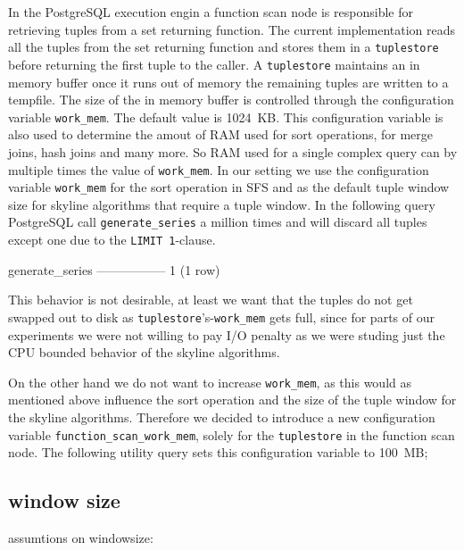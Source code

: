 In the PostgreSQL execution engin a function scan node is responsible
for retrieving tuples from a set returning function. The current
implementation reads all the tuples from the set returning function
and stores them in a \texttt{tuplestore} before returning the first
tuple to the caller. A \texttt{tuplestore} maintains an in memory
buffer once it runs out of memory the remaining tuples are written to
a tempfile. The size of the in memory buffer is controlled through the
configuration variable \texttt{work\_mem}. The default value is
1024~KB. This configuration variable is also used to determine the amout
of RAM used for sort operations, for merge joins, hash joins and many more.
So RAM used for a single complex query can by multiple times the value of 
\texttt{work\_mem}.
In our setting we use the configuration variable \texttt{work\_mem}
for the sort operation in SFS and as the default tuple window size for
skyline algorithms that require a tuple window. In the following query
PostgreSQL call \texttt{generate\_series} a million times and will
discard all tuples except one due to the
\texttt{LIMIT 1}-clause.

\begin{sqlscript}
 generate_series
-----------------
               1
(1 row)
\end{sqlscript}

This behavior is not desirable, at least we want that the tuples do
not get swapped out to disk as
\texttt{tuplestore}'s-\texttt{work\_mem} gets full, since for parts
of our experiments we were not willing to pay I/O penalty as we were
studing just the CPU bounded behavior of the skyline algorithms.

On the other hand we do not want to increase \texttt{work\_mem}, as
this would as mentioned above influence the sort operation and the size
of the tuple window for the skyline algorithms. Therefore we decided
to introduce a new configuration variable
\texttt{function\_scan\_work\_mem}, solely for the \texttt{tuplestore}
in the function scan node. The following utility query sets this
configuration variable to 100~MB;

\begin{sqlscript}
\end{sqlscript}


\subsection{window size}
assumtions on windowsize:

